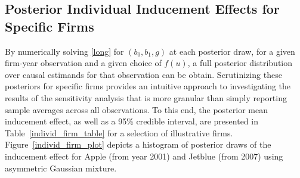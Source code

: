 \documentclass[aoas,preprint, 11pt, dvipsnames, table, x11name]{imsart}
\theoremstyle{remark}
\begin{document}
	\subsection{Posterior Individual Inducement Effects for Specific Firms}\label{individ_firms}
	By numerically solving \ref{long} for $(b_0, b_1, g)$ at each posterior draw, for a given firm-year observation and a given choice of $f(u)$, a full posterior distribution over causal estimands for that observation can be obtain.  Scrutinizing these posteriors for specific firms provides an intuitive approach to investigating the results of the sensitivity analysis that is more granular than simply reporting sample averages across all observations. To this end, the posterior mean inducement effect, as well as a 95\% credible interval, are presented in Table~\ref{individ_firm_table} for a selection of illustrative firms.  Figure~\ref{individ_firm_plot} depicts a histogram of posterior draws of the inducement effect for Apple (from year 2001) and Jetblue (from 2007) using asymmetric Gaussian mixture.
	
\end{document}
